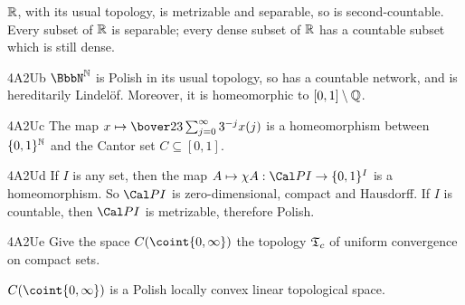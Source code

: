 $\Bbb R$, with its usual topology, is metrizable and
separable, so is
second-countable.
Every subset of $\Bbb R$ is separable;
every dense subset of $\Bbb R$ has a countable subset which is still
dense.

\spheader 4A2Ub $\BbbN^{\Bbb N}$ is Polish in its usual
topology,
so has a countable network,
and is hereditarily Lindel\"of.
Moreover, it is homeomorphic to
$[0,1]\setminus\Bbb Q$.

\spheader 4A2Uc The map
$x\mapsto\bover23\sum_{j=0}^{\infty}3^{-j}x(j)$
is a homeomorphism between $\{0,1\}^{\Bbb N}$ and the Cantor set
$C\subseteq[0,1]$.   

\spheader 4A2Ud If $I$ is any set, then the map
$A\mapsto\chi A:\Cal PI\to\{0,1\}^I$ is a homeomorphism.   So $\Cal PI$ is zero-dimensional, compact
and Hausdorff.   If $I$ is countable, then $\Cal PI$ is metrizable,
therefore Polish.

\spheader 4A2Ue Give the space $C(\coint{0,\infty})$ the topology
$\frak T_c$ of uniform convergence on compact sets.

\medskip

 $C(\coint{0,\infty})$ is a Polish locally convex
linear topological space.   

\medskip

